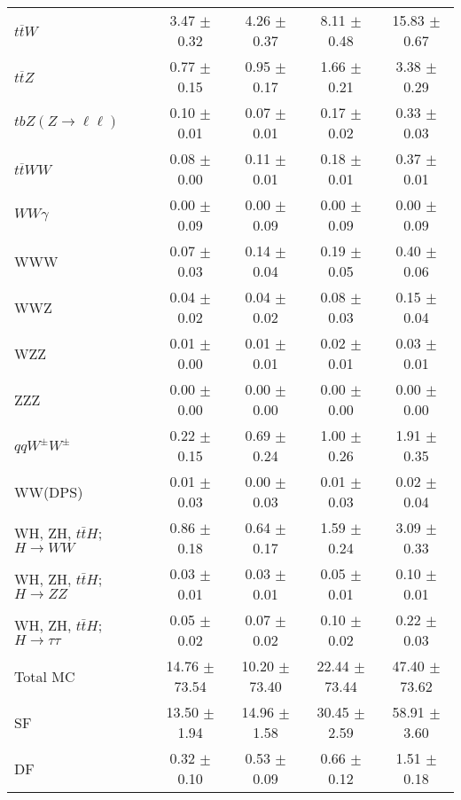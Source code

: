 \begin{tabular}{l|cccc}
                   $t\overline{t}W$ &  3.47 $\pm$  0.32 &  4.26 $\pm$  0.37 &  8.11 $\pm$  0.48 & 15.83 $\pm$  0.67 \\
                   $t\overline{t}Z$ &  0.77 $\pm$  0.15 &  0.95 $\pm$  0.17 &  1.66 $\pm$  0.21 &  3.38 $\pm$  0.29 \\
    $tbZ (Z \rightarrow \ell \ell)$ &  0.10 $\pm$  0.01 &  0.07 $\pm$  0.01 &  0.17 $\pm$  0.02 &  0.33 $\pm$  0.03 \\
                  $t\overline{t}WW$ &  0.08 $\pm$  0.00 &  0.11 $\pm$  0.01 &  0.18 $\pm$  0.01 &  0.37 $\pm$  0.01 \\
                         $WW\gamma$ &  0.00 $\pm$  0.09 &  0.00 $\pm$  0.09 &  0.00 $\pm$  0.09 &  0.00 $\pm$  0.09 \\
                                WWW &  0.07 $\pm$  0.03 &  0.14 $\pm$  0.04 &  0.19 $\pm$  0.05 &  0.40 $\pm$  0.06 \\
                                WWZ &  0.04 $\pm$  0.02 &  0.04 $\pm$  0.02 &  0.08 $\pm$  0.03 &  0.15 $\pm$  0.04 \\
                                WZZ &  0.01 $\pm$  0.00 &  0.01 $\pm$  0.01 &  0.02 $\pm$  0.01 &  0.03 $\pm$  0.01 \\
                                ZZZ &  0.00 $\pm$  0.00 &  0.00 $\pm$  0.00 &  0.00 $\pm$  0.00 &  0.00 $\pm$  0.00 \\
                 $qqW^{\pm}W^{\pm}$ &  0.22 $\pm$  0.15 &  0.69 $\pm$  0.24 &  1.00 $\pm$  0.26 &  1.91 $\pm$  0.35 \\
                            WW(DPS) &  0.01 $\pm$  0.03 &  0.00 $\pm$  0.03 &  0.01 $\pm$  0.03 &  0.02 $\pm$  0.04 \\
WH, ZH, $t\bar{t}H$; $H \rightarrow WW$ &  0.86 $\pm$  0.18 &  0.64 $\pm$  0.17 &  1.59 $\pm$  0.24 &  3.09 $\pm$  0.33 \\
WH, ZH, $t\bar{t}H$; $H \rightarrow ZZ$ &  0.03 $\pm$  0.01 &  0.03 $\pm$  0.01 &  0.05 $\pm$  0.01 &  0.10 $\pm$  0.01 \\
WH, ZH, $t\bar{t}H$; $H \rightarrow \tau\tau$ &  0.05 $\pm$  0.02 &  0.07 $\pm$  0.02 &  0.10 $\pm$  0.02 &  0.22 $\pm$  0.03 \\
\hline\hline
                           Total MC & 14.76 $\pm$ 73.54 & 10.20 $\pm$ 73.40 & 22.44 $\pm$ 73.44 & 47.40 $\pm$ 73.62 \\
\hline
                                 SF & 13.50 $\pm$  1.94 & 14.96 $\pm$  1.58 & 30.45 $\pm$  2.59 & 58.91 $\pm$  3.60 \\
                                 DF &  0.32 $\pm$  0.10 &  0.53 $\pm$  0.09 &  0.66 $\pm$  0.12 &  1.51 $\pm$  0.18 \\

\end{tabular}
